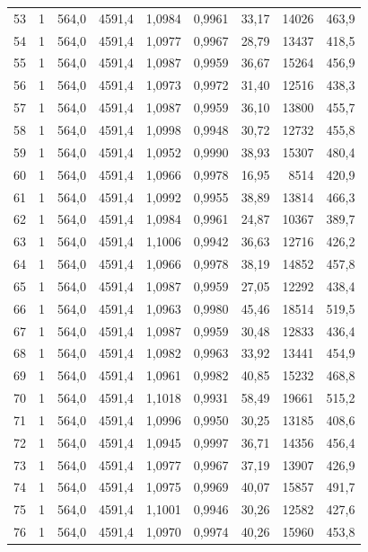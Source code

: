 \documentclass[11pt,a4paper]{article}
\begin{document}
{\begin{longtable}{r c r r r r r r r}
53 & 1 & 564,0 & 4591,4 & 1,0984 & 0,9961 & 33,17 & 14026 & 463,9 \\
54 & 1 & 564,0 & 4591,4 & 1,0977 & 0,9967 & 28,79 & 13437 & 418,5 \\
55 & 1 & 564,0 & 4591,4 & 1,0987 & 0,9959 & 36,67 & 15264 & 456,9 \\
56 & 1 & 564,0 & 4591,4 & 1,0973 & 0,9972 & 31,40 & 12516 & 438,3 \\
57 & 1 & 564,0 & 4591,4 & 1,0987 & 0,9959 & 36,10 & 13800 & 455,7 \\
58 & 1 & 564,0 & 4591,4 & 1,0998 & 0,9948 & 30,72 & 12732 & 455,8 \\
59 & 1 & 564,0 & 4591,4 & 1,0952 & 0,9990 & 38,93 & 15307 & 480,4 \\
60 & 1 & 564,0 & 4591,4 & 1,0966 & 0,9978 & 16,95 & 8514 & 420,9 \\
61 & 1 & 564,0 & 4591,4 & 1,0992 & 0,9955 & 38,89 & 13814 & 466,3 \\
62 & 1 & 564,0 & 4591,4 & 1,0984 & 0,9961 & 24,87 & 10367 & 389,7 \\
63 & 1 & 564,0 & 4591,4 & 1,1006 & 0,9942 & 36,63 & 12716 & 426,2 \\
64 & 1 & 564,0 & 4591,4 & 1,0966 & 0,9978 & 38,19 & 14852 & 457,8 \\
65 & 1 & 564,0 & 4591,4 & 1,0987 & 0,9959 & 27,05 & 12292 & 438,4 \\
66 & 1 & 564,0 & 4591,4 & 1,0963 & 0,9980 & 45,46 & 18514 & 519,5 \\
67 & 1 & 564,0 & 4591,4 & 1,0987 & 0,9959 & 30,48 & 12833 & 436,4 \\
68 & 1 & 564,0 & 4591,4 & 1,0982 & 0,9963 & 33,92 & 13441 & 454,9 \\
69 & 1 & 564,0 & 4591,4 & 1,0961 & 0,9982 & 40,85 & 15232 & 468,8 \\
70 & 1 & 564,0 & 4591,4 & 1,1018 & 0,9931 & 58,49 & 19661 & 515,2 \\
71 & 1 & 564,0 & 4591,4 & 1,0996 & 0,9950 & 30,25 & 13185 & 408,6 \\
72 & 1 & 564,0 & 4591,4 & 1,0945 & 0,9997 & 36,71 & 14356 & 456,4 \\
73 & 1 & 564,0 & 4591,4 & 1,0977 & 0,9967 & 37,19 & 13907 & 426,9 \\
74 & 1 & 564,0 & 4591,4 & 1,0975 & 0,9969 & 40,07 & 15857 & 491,7 \\
75 & 1 & 564,0 & 4591,4 & 1,1001 & 0,9946 & 30,26 & 12582 & 427,6 \\
76 & 1 & 564,0 & 4591,4 & 1,0970 & 0,9974 & 40,26 & 15960 & 453,8 \\

\end{longtable}}
\end{document}
